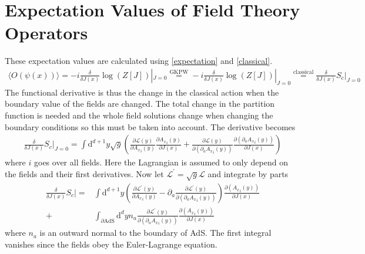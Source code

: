 \documentclass[12pt]{report}
\renewcommand{\d}{\ensuremath{\mathrm{d}}}
\renewcommand{\L}{\ensuremath{\mathcal{L}}}
\newcommand{\At}{\ensuremath{{A_x}}}
\begin{document}
\section{Expectation Values of Field Theory Operators}
These expectation values are calculated using \eqref{expectation} and \eqref{classical}.
\begin{equation}
\begin{split}
\langle O(\psi(x))\rangle=-i\frac{\delta}{\delta J(x)}\log(Z[J])|_{J=0}\stackrel{\mathrm{GKPW}}{=}-i\frac{\delta}{\delta J(x)}\log(Z[J])|_{J=0}\stackrel{\mathrm{classical}}{=}\frac{\delta}{\delta J(x)}S_c|_{J=0}
\end{split}
\end{equation}
The functional derivative is thus the change in the classical action when the boundary value of the fields are changed. The total change in the partition function is needed and the whole field solutions change when changing the boundary conditions so this must be taken into account. The derivative becomes
\begin{equation}
\begin{split}
\frac{\delta}{\delta J(x)}S_c|_{J=0}=\int \d^{d+1}y\sqrt{g}\left(\frac{\partial\L(y)}{\partial \At_i(y)}\frac{\partial \At_i(y)}{\partial J(x)}+\frac{\partial\L(y)}{\partial (\partial_a\At_i(y))}\frac{\partial (\partial_a\At_i(y))}{\partial J(x)}\right)
\end{split}
\end{equation}
where $i$ goes over all fields. Here the Lagrangian is assumed to only depend on the fields and their first derivatives. Now let $\L^\prime=\sqrt{g}\L$ and integrate by parts
\begin{equation}
\begin{split}
\frac{\delta}{\delta J(x)}S_c|=&\int \d^{d+1}y\left(\frac{\partial\L^\prime(y)}{\partial \At_i(y)}-\partial_a\frac{\partial\L^\prime(y)}{\partial (\partial_a\At_i(y))}\right)\frac{\partial (\At_i(y))}{\partial J(x)}\\
+&\int_{\partial\mathrm{AdS}} \d^{d}yn_a\frac{\partial\L^\prime(y)}{\partial (\partial_a\At_i(y))}\frac{\partial (\At_i(y))}{\partial J(x)}
\end{split}
\end{equation}
where $n_a$ is an outward normal to the boundary of AdS.
The first integral vanishes since the fields obey the Euler-Lagrange equation.
\end{document}
